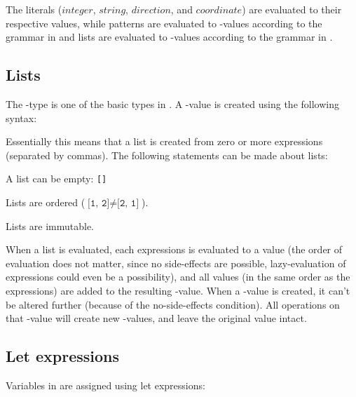 The literals ($integer$, $string$, $direction$, and $coordinate$) are evaluated to their
respective values, while patterns are evaluated to -values according to
the grammar in  and lists are evaluated to -values
according to the grammar in .

\subsection{Lists}
\label{sec:lists}

The -type is one of the basic types in \productname{}. A -value is
created using the following syntax:

\begin{ebnf}
\end{ebnf}

Essentially this means that a list is created from zero or more expressions (separated
by commas). The following statements can be made about lists:

\begin{nlist}
\item A list can be empty: \texttt{[]}
\item Lists are ordered ($\texttt{[1, 2]} \ne \texttt{[2, 1]}$).
\item Lists are immutable.
\end{nlist}

When a list is evaluated, each expressions is evaluated to a value (the order
of evaluation does not matter, since no side-effects are possible, lazy-evaluation of expressions
could even be a possibility), and all values (in the same order as the expressions) are
added to the resulting -value. When a -value is created, it can't be
altered further (because of the no-side-effects condition). All operations on that -value
will create new -values, and leave the original value intact.

\subsection{Let expressions}

Variables in \productname{} are assigned using let expressions:

\begin{ebnf}
\end{ebnf}

